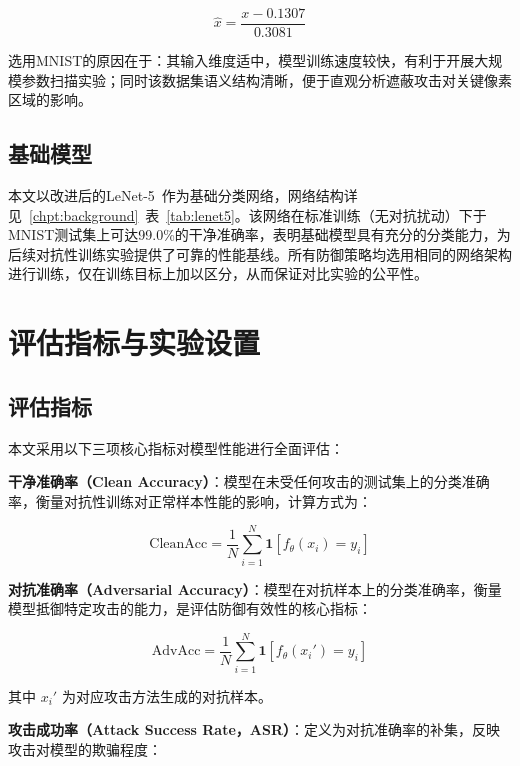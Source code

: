\begin{equation}
  \hat{x} = \frac{x - 0.1307}{0.3081}
\end{equation}

选用MNIST的原因在于：其输入维度适中，模型训练速度较快，有利于开展大规模参数扫描实验；同时该数据集语义结构清晰，便于直观分析遮蔽攻击对关键像素区域的影响。

\subsection{基础模型}

本文以改进后的LeNet-5~\cite{lecun1998lenet}作为基础分类网络，网络结构详见~\ref{chpt:background}~表~\ref{tab:lenet5}。该网络在标准训练（无对抗扰动）下于MNIST测试集上可达99.0\%的干净准确率，表明基础模型具有充分的分类能力，为后续对抗性训练实验提供了可靠的性能基线。所有防御策略均选用相同的网络架构进行训练，仅在训练目标上加以区分，从而保证对比实验的公平性。

\section{评估指标与实验设置}

\subsection{评估指标}

本文采用以下三项核心指标对模型性能进行全面评估：

\textbf{干净准确率（Clean Accuracy）}：模型在未受任何攻击的测试集上的分类准确率，衡量对抗性训练对正常样本性能的影响，计算方式为：

\begin{equation}
  \text{CleanAcc} = \frac{1}{N} \sum_{i=1}^{N} \mathbf{1}\!\left[f_\theta(x_i) = y_i\right]
\end{equation}

\textbf{对抗准确率（Adversarial Accuracy）}：模型在对抗样本上的分类准确率，衡量模型抵御特定攻击的能力，是评估防御有效性的核心指标：

\begin{equation}
  \text{AdvAcc} = \frac{1}{N} \sum_{i=1}^{N} \mathbf{1}\!\left[f_\theta(x_i') = y_i\right]
\end{equation}

其中 $x_i'$ 为对应攻击方法生成的对抗样本。

\textbf{攻击成功率（Attack Success Rate，ASR）}：定义为对抗准确率的补集，反映攻击对模型的欺骗程度：

